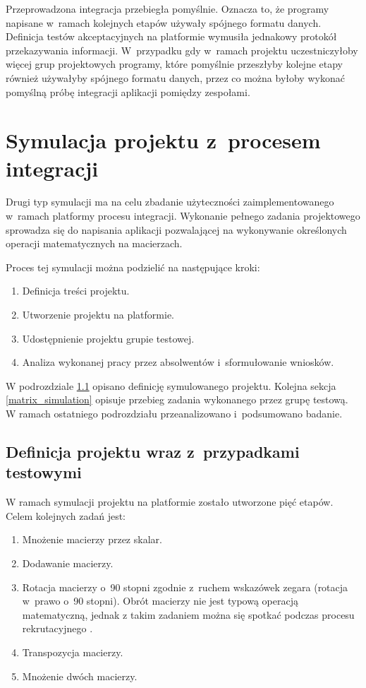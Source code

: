 Przeprowadzona integracja przebiegła pomyślnie.
Oznacza to, że programy napisane w~ramach kolejnych etapów używały spójnego formatu danych.
Definicja testów akceptacyjnych na platformie wymusiła jednakowy protokół przekazywania informacji.
W~przypadku gdy w~ramach projektu uczestniczyłoby więcej grup projektowych programy, które pomyślnie przeszłyby kolejne etapy również używałyby spójnego formatu danych, przez co można byłoby wykonać pomyślną próbę integracji aplikacji pomiędzy zespołami.

\section{Symulacja projektu z~procesem integracji}
\label{research_matrix}

Drugi typ symulacji ma na celu zbadanie użyteczności zaimplementowanego w~ramach platformy procesu integracji.
Wykonanie pełnego zadania projektowego sprowadza się do napisania aplikacji pozwalającej na wykonywanie określonych operacji matematycznych na macierzach.

Proces tej symulacji można podzielić na następujące kroki:
\begin{enumerate}
    \item Definicja treści projektu.
    \item Utworzenie projektu na platformie.
    \item Udostępnienie projektu grupie testowej.
    \item Analiza wykonanej pracy przez absolwentów i~sformułowanie wniosków.
\end{enumerate}

W podrozdziale \ref{matrix_project_definition} opisano definicję symulowanego projektu.
Kolejna sekcja \ref{matrix_simulation} opisuje przebieg zadania wykonanego przez grupę testową.
W ramach ostatniego podrozdziału przeanalizowano i~podsumowano badanie.


\subsection{Definicja projektu wraz z~przypadkami testowymi}
\label{matrix_project_definition}

W ramach symulacji projektu na platformie zostało utworzone pięć etapów.
Celem kolejnych zadań jest:
\begin{enumerate}
    \item Mnożenie macierzy przez skalar.
    \item Dodawanie macierzy.
    \item Rotacja macierzy o~90 stopni zgodnie z~ruchem wskazówek zegara (rotacja w~prawo o~90 stopni).
    Obrót macierzy nie jest typową operacją matematyczną, jednak z takim zadaniem można się spotkać podczas procesu rekrutacyjnego \cite{cracking-the-coding-interview}.
    \item Transpozycja macierzy.
    \item Mnożenie dwóch macierzy.
\end{enumerate}

